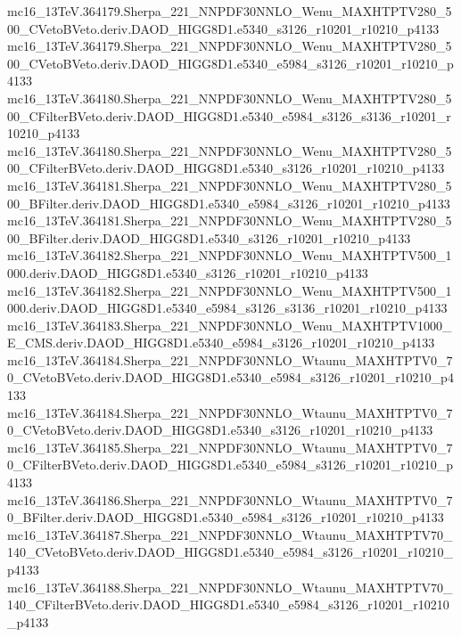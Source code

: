 \begin{scriptsize}
mc16\_13TeV.364179.Sherpa\_221\_NNPDF30NNLO\_Wenu\_MAXHTPTV280\_500\_CVetoBVeto.deriv.DAOD\_HIGG8D1.e5340\_s3126\_r10201\_r10210\_p4133 \\
mc16\_13TeV.364179.Sherpa\_221\_NNPDF30NNLO\_Wenu\_MAXHTPTV280\_500\_CVetoBVeto.deriv.DAOD\_HIGG8D1.e5340\_e5984\_s3126\_r10201\_r10210\_p4133 \\
mc16\_13TeV.364180.Sherpa\_221\_NNPDF30NNLO\_Wenu\_MAXHTPTV280\_500\_CFilterBVeto.deriv.DAOD\_HIGG8D1.e5340\_e5984\_s3126\_s3136\_r10201\_r10210\_p4133 \\
mc16\_13TeV.364180.Sherpa\_221\_NNPDF30NNLO\_Wenu\_MAXHTPTV280\_500\_CFilterBVeto.deriv.DAOD\_HIGG8D1.e5340\_s3126\_r10201\_r10210\_p4133 \\
mc16\_13TeV.364181.Sherpa\_221\_NNPDF30NNLO\_Wenu\_MAXHTPTV280\_500\_BFilter.deriv.DAOD\_HIGG8D1.e5340\_e5984\_s3126\_r10201\_r10210\_p4133 \\
mc16\_13TeV.364181.Sherpa\_221\_NNPDF30NNLO\_Wenu\_MAXHTPTV280\_500\_BFilter.deriv.DAOD\_HIGG8D1.e5340\_s3126\_r10201\_r10210\_p4133 \\
mc16\_13TeV.364182.Sherpa\_221\_NNPDF30NNLO\_Wenu\_MAXHTPTV500\_1000.deriv.DAOD\_HIGG8D1.e5340\_s3126\_r10201\_r10210\_p4133 \\
mc16\_13TeV.364182.Sherpa\_221\_NNPDF30NNLO\_Wenu\_MAXHTPTV500\_1000.deriv.DAOD\_HIGG8D1.e5340\_e5984\_s3126\_s3136\_r10201\_r10210\_p4133 \\
mc16\_13TeV.364183.Sherpa\_221\_NNPDF30NNLO\_Wenu\_MAXHTPTV1000\_E\_CMS.deriv.DAOD\_HIGG8D1.e5340\_e5984\_s3126\_r10201\_r10210\_p4133 \\
mc16\_13TeV.364184.Sherpa\_221\_NNPDF30NNLO\_Wtaunu\_MAXHTPTV0\_70\_CVetoBVeto.deriv.DAOD\_HIGG8D1.e5340\_e5984\_s3126\_r10201\_r10210\_p4133 \\
mc16\_13TeV.364184.Sherpa\_221\_NNPDF30NNLO\_Wtaunu\_MAXHTPTV0\_70\_CVetoBVeto.deriv.DAOD\_HIGG8D1.e5340\_s3126\_r10201\_r10210\_p4133 \\
mc16\_13TeV.364185.Sherpa\_221\_NNPDF30NNLO\_Wtaunu\_MAXHTPTV0\_70\_CFilterBVeto.deriv.DAOD\_HIGG8D1.e5340\_e5984\_s3126\_r10201\_r10210\_p4133 \\
mc16\_13TeV.364186.Sherpa\_221\_NNPDF30NNLO\_Wtaunu\_MAXHTPTV0\_70\_BFilter.deriv.DAOD\_HIGG8D1.e5340\_e5984\_s3126\_r10201\_r10210\_p4133 \\
mc16\_13TeV.364187.Sherpa\_221\_NNPDF30NNLO\_Wtaunu\_MAXHTPTV70\_140\_CVetoBVeto.deriv.DAOD\_HIGG8D1.e5340\_e5984\_s3126\_r10201\_r10210\_p4133 \\
mc16\_13TeV.364188.Sherpa\_221\_NNPDF30NNLO\_Wtaunu\_MAXHTPTV70\_140\_CFilterBVeto.deriv.DAOD\_HIGG8D1.e5340\_e5984\_s3126\_r10201\_r10210\_p4133 \\

\end{scriptsize}
